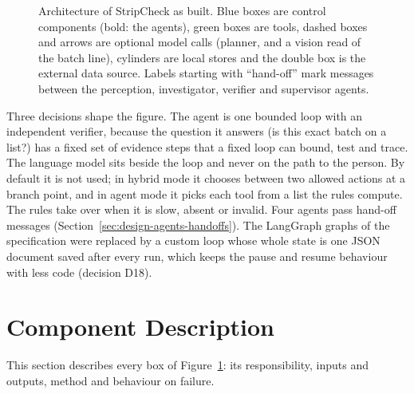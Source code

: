 \begin{figure}[!htbp]
{}
\caption{Architecture of StripCheck as built. Blue boxes are control components (bold: the agents),
green boxes are tools, dashed boxes and arrows are optional model calls (planner, and a vision read of the batch line), cylinders are local stores and the double box is
the external data source. Labels starting with ``hand-off'' mark messages between the perception,
investigator, verifier and supervisor agents.}
\label{fig:arch}
\end{figure}

Three decisions shape the figure. The agent is one bounded loop with an independent verifier,
because the question it answers (is this exact batch on a list?) has a fixed set of evidence steps
that a fixed loop can bound, test and trace. The language model sits beside the loop and never on
the path to the person. By default it is not used; in hybrid mode it chooses between two allowed
actions at a branch point, and in agent mode it picks each tool from a list the rules compute. The rules take over
when it is slow, absent or invalid. Four agents pass hand-off messages (Section~\ref{sec:design-agents-handoffs}). The LangGraph graphs of the specification were replaced by
a custom loop whose whole state is one JSON document saved after every run, which keeps the pause
and resume behaviour with less code (decision D18).

\section{Component Description}
\label{sec:design-component-description}

This section describes every box of Figure~\ref{fig:arch}: its responsibility, inputs and outputs,
method and behaviour on failure.

